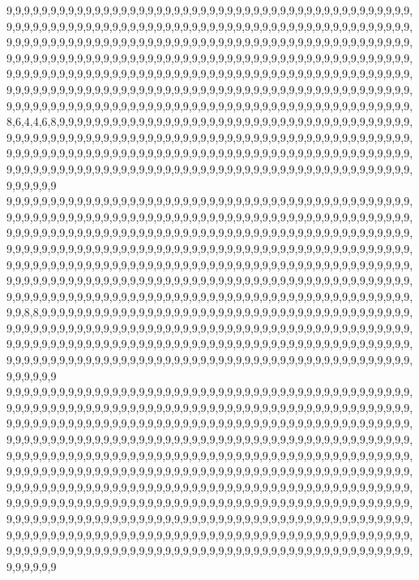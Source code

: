 9,9,9,9,9,9,9,9,9,9,9,9,9,9,9,9,9,9,9,9,9,9,9,9,9,9,9,9,9,9,9,9,9,9,9,9,9,9,9,9,9,9,9,9,9,9,9,9,9,9,9,9,9,9,9,9,9,9,9,9,9,9,9,9,9,9,9,9,9,9,9,9,9,9,9,9,9,9,9,9,9,9,9,9,9,9,9,9,9,9,9,9,9,9,9,9,9,9,9,9,9,9,9,9,9,9,9,9,9,9,9,9,9,9,9,9,9,9,9,9,9,9,9,9,9,9,9,9,9,9,9,9,9,9,9,9,9,9,9,9,9,9,9,9,9,9,9,9,9,9,9,9,9,9,9,9,9,9,9,9,9,9,9,9,9,9,9,9,9,9,9,9,9,9,9,9,9,9,9,9,9,9,9,9,9,9,9,9,9,9,9,9,9,9,9,9,9,9,9,9,9,9,9,9,9,9,9,9,9,9,9,9,9,9,9,9,9,9,9,9,9,9,9,9,9,9,9,9,9,9,9,9,9,9,9,9,9,9,9,9,9,9,9,9,9,9,9,9,9,9,9,9,9,9,9,9,9,9,9,9,9,9,9,9,9,9,9,9,9,9,9,9,9,9,9,9,9,9,9,9,9,9,9,9,9,9,9,9,9,9,9,9,9,9,9,9,9,9,9,9,9,9,9,9,9,9,9,9,9,9,9,9,9,9,9,9,9,9,9,9,9,9,8,6,4,4,6,8,9,9,9,9,9,9,9,9,9,9,9,9,9,9,9,9,9,9,9,9,9,9,9,9,9,9,9,9,9,9,9,9,9,9,9,9,9,9,9,9,9,9,9,9,9,9,9,9,9,9,9,9,9,9,9,9,9,9,9,9,9,9,9,9,9,9,9,9,9,9,9,9,9,9,9,9,9,9,9,9,9,9,9,9,9,9,9,9,9,9,9,9,9,9,9,9,9,9,9,9,9,9,9,9,9,9,9,9,9,9,9,9,9,9,9,9,9,9,9,9,9,9,9,9,9,9,9,9,9,9,9,9,9,9,9,9,9,9,9,9,9,9,9,9,9,9,9,9,9,9,9,9,9,9,9,9,9,9,9,9,9,9,9,9,9,9,9,9,9,9,9,9,9,9,9,9,9,9,9,9,9,9,9,9
9,9,9,9,9,9,9,9,9,9,9,9,9,9,9,9,9,9,9,9,9,9,9,9,9,9,9,9,9,9,9,9,9,9,9,9,9,9,9,9,9,9,9,9,9,9,9,9,9,9,9,9,9,9,9,9,9,9,9,9,9,9,9,9,9,9,9,9,9,9,9,9,9,9,9,9,9,9,9,9,9,9,9,9,9,9,9,9,9,9,9,9,9,9,9,9,9,9,9,9,9,9,9,9,9,9,9,9,9,9,9,9,9,9,9,9,9,9,9,9,9,9,9,9,9,9,9,9,9,9,9,9,9,9,9,9,9,9,9,9,9,9,9,9,9,9,9,9,9,9,9,9,9,9,9,9,9,9,9,9,9,9,9,9,9,9,9,9,9,9,9,9,9,9,9,9,9,9,9,9,9,9,9,9,9,9,9,9,9,9,9,9,9,9,9,9,9,9,9,9,9,9,9,9,9,9,9,9,9,9,9,9,9,9,9,9,9,9,9,9,9,9,9,9,9,9,9,9,9,9,9,9,9,9,9,9,9,9,9,9,9,9,9,9,9,9,9,9,9,9,9,9,9,9,9,9,9,9,9,9,9,9,9,9,9,9,9,9,9,9,9,9,9,9,9,9,9,9,9,9,9,9,9,9,9,9,9,9,9,9,9,9,9,9,9,9,9,9,9,9,9,9,9,9,9,9,9,9,9,9,9,9,9,9,9,9,9,9,9,9,9,9,9,9,8,8,9,9,9,9,9,9,9,9,9,9,9,9,9,9,9,9,9,9,9,9,9,9,9,9,9,9,9,9,9,9,9,9,9,9,9,9,9,9,9,9,9,9,9,9,9,9,9,9,9,9,9,9,9,9,9,9,9,9,9,9,9,9,9,9,9,9,9,9,9,9,9,9,9,9,9,9,9,9,9,9,9,9,9,9,9,9,9,9,9,9,9,9,9,9,9,9,9,9,9,9,9,9,9,9,9,9,9,9,9,9,9,9,9,9,9,9,9,9,9,9,9,9,9,9,9,9,9,9,9,9,9,9,9,9,9,9,9,9,9,9,9,9,9,9,9,9,9,9,9,9,9,9,9,9,9,9,9,9,9,9,9,9,9,9,9,9,9,9,9,9,9,9,9,9,9,9,9,9,9,9,9,9,9,9,9,9
9,9,9,9,9,9,9,9,9,9,9,9,9,9,9,9,9,9,9,9,9,9,9,9,9,9,9,9,9,9,9,9,9,9,9,9,9,9,9,9,9,9,9,9,9,9,9,9,9,9,9,9,9,9,9,9,9,9,9,9,9,9,9,9,9,9,9,9,9,9,9,9,9,9,9,9,9,9,9,9,9,9,9,9,9,9,9,9,9,9,9,9,9,9,9,9,9,9,9,9,9,9,9,9,9,9,9,9,9,9,9,9,9,9,9,9,9,9,9,9,9,9,9,9,9,9,9,9,9,9,9,9,9,9,9,9,9,9,9,9,9,9,9,9,9,9,9,9,9,9,9,9,9,9,9,9,9,9,9,9,9,9,9,9,9,9,9,9,9,9,9,9,9,9,9,9,9,9,9,9,9,9,9,9,9,9,9,9,9,9,9,9,9,9,9,9,9,9,9,9,9,9,9,9,9,9,9,9,9,9,9,9,9,9,9,9,9,9,9,9,9,9,9,9,9,9,9,9,9,9,9,9,9,9,9,9,9,9,9,9,9,9,9,9,9,9,9,9,9,9,9,9,9,9,9,9,9,9,9,9,9,9,9,9,9,9,9,9,9,9,9,9,9,9,9,9,9,9,9,9,9,9,9,9,9,9,9,9,9,9,9,9,9,9,9,9,9,9,9,9,9,9,9,9,9,9,9,9,9,9,9,9,9,9,9,9,9,9,9,9,9,9,9,9,9,9,9,9,9,9,9,9,9,9,9,9,9,9,9,9,9,9,9,9,9,9,9,9,9,9,9,9,9,9,9,9,9,9,9,9,9,9,9,9,9,9,9,9,9,9,9,9,9,9,9,9,9,9,9,9,9,9,9,9,9,9,9,9,9,9,9,9,9,9,9,9,9,9,9,9,9,9,9,9,9,9,9,9,9,9,9,9,9,9,9,9,9,9,9,9,9,9,9,9,9,9,9,9,9,9,9,9,9,9,9,9,9,9,9,9,9,9,9,9,9,9,9,9,9,9,9,9,9,9,9,9,9,9,9,9,9,9,9,9,9,9,9,9,9,9,9,9,9,9,9,9,9,9,9,9,9,9,9,9,9,9,9,9,9,9,9,9,9,9,9,9,9,9,9,9,9,9,9,9,9,9,9,9,9,9,9,9
